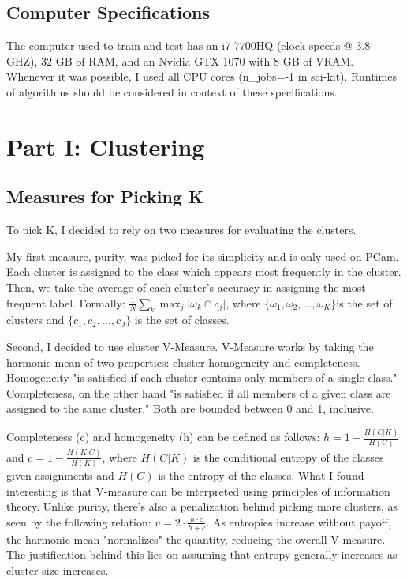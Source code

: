 \documentclass[letter]{article}
\begin{document}
\subsection{Computer Specifications}
The computer used to train and test has an i7-7700HQ (clock speeds @ 3.8 GHZ), 32 GB of RAM, and an Nvidia GTX 1070 with 8 GB of VRAM. Whenever it was possible, I used all CPU cores (n\_jobs=-1 in sci-kit). Runtimes of algorithms should be considered in context of these specifications.

\section{Part I: Clustering}
\subsection{Measures for Picking K}
To pick K, I decided to rely on two measures for evaluating the clusters.

My first measure, purity, was picked for its simplicity and is only used on PCam. Each cluster is assigned to the class which appears most frequently in the cluster. Then, we take the average of each cluster's accuracy in assigning the most frequent label. Formally: $\frac{1}{N}\sum_k \max_j\vert\omega_k \cap c_j\vert$, where $\{ \omega_1, \omega_2, \ldots, \omega_K \}$is the set of clusters and $\{ c_1,c_2,\ldots,c_J \}$ is the set of classes\autocite{Manning:2008:IIR:1394399}.

Second, I decided to use cluster V-Measure\autocite{RosenbergH07}. V-Measure works by taking the harmonic mean of two properties: cluster homogeneity and completeness. Homogeneity "is satisfied if each cluster contains only members of a single class." Completeness, on the other hand "is satisfied if all members of a given class are assigned to the same cluster." Both are bounded between 0 and 1, inclusive.

Completeness (c) and homogeneity (h) can be defined as follows: $h = 1 - \frac{H(C|K)}{H(C)}$ and $c = 1 - \frac{H(K|C)}{H(K)}$, where $H(C|K)$ is the conditional entropy of the classes given assignments and $H(C)$ is the entropy of the classes. What I found interesting is that V-measure can be interpreted using principles of information theory. Unlike purity, there's also a penalization behind picking more clusters, as seen by the following relation: $v = 2 \cdot \frac{h \cdot c}{h + c}$. As entropies increase without payoff, the harmonic mean "normalizes" the quantity, reducing the overall V-measure. The justification behind this lies on assuming that entropy generally increases as cluster size increases.
\end{document}
